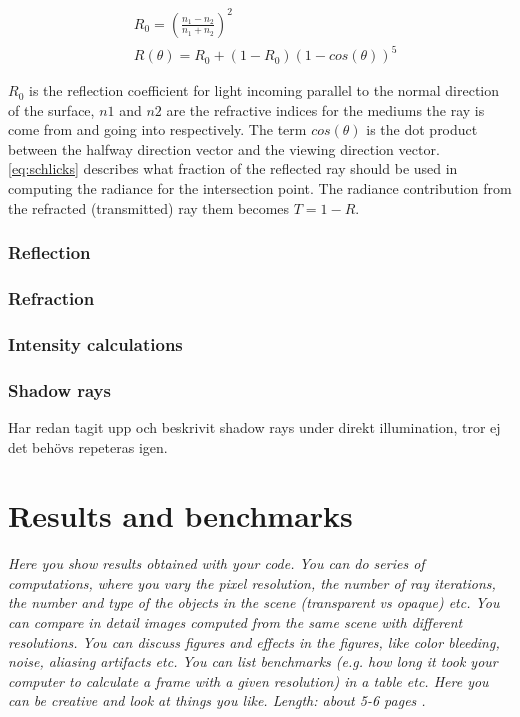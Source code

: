 \documentclass[]{report}   %
\begin{document}
\begin{subequations} \label{eq:schlicks}
\begin{align}
	&R_0 = \left( \frac{n_1-n_2}{n_1+n_2} \right) ^2 \\
	&R(\theta) = R_0+ (1-R_0)(1-cos(\theta))^5
\end{align}
\end{subequations}

$R_0$ is the reflection coefficient for light incoming parallel to the normal direction of the surface, $n1$ and $n2$ are the refractive indices for the mediums the ray is come from and going into respectively.
The term $cos(\theta)$ is the dot product between the halfway direction vector and the viewing direction vector. \autoref{eq:schlicks} describes what fraction of the reflected ray should be used in computing the radiance for the intersection point. 
The radiance contribution from the refracted (transmitted) ray them becomes $T=1-R$.

\subsection{Reflection}
\subsection{Refraction}
\subsection{Intensity calculations}
\subsection{Shadow rays}
Har redan tagit upp och beskrivit shadow rays under direkt illumination, tror ej det behövs repeteras igen.
\chapter{Results and benchmarks}
\emph{Here you show results obtained with your code. 
You can do series of computations, where you vary the pixel resolution, the number of ray iterations, the number and type of the objects in the scene (transparent vs opaque) etc. 
You can compare in detail images computed from the same scene with different resolutions. 
You can discuss figures and effects in the figures, like color bleeding, noise, aliasing artifacts etc. 
You can list benchmarks (e.g. how long it took your computer to calculate a frame with a given resolution) in a table etc. 
Here you can be creative and look at things you like. 
Length: about 5-6 pages .}
\end{document}
